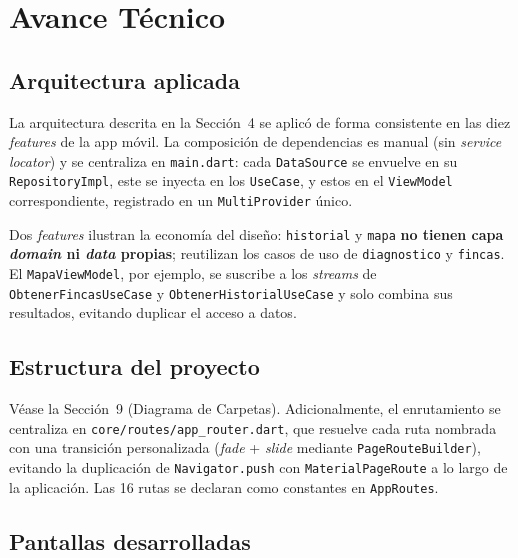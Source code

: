 \documentclass[12pt,a4paper]{article}
\begin{document}
\newpage
\section{Avance Técnico}

\subsection{Arquitectura aplicada}

La arquitectura descrita en la Sección~4 se aplicó de forma consistente en las
diez \textit{features} de la app móvil. La composición de dependencias es manual
(sin \textit{service locator}) y se centraliza en \texttt{main.dart}: cada
\texttt{DataSource} se envuelve en su \texttt{RepositoryImpl}, este se inyecta en
los \texttt{UseCase}, y estos en el \texttt{ViewModel} correspondiente,
registrado en un \texttt{MultiProvider} único.

Dos \textit{features} ilustran la economía del diseño: \texttt{historial} y
\texttt{mapa} \textbf{no tienen capa \textit{domain} ni \textit{data} propias};
reutilizan los casos de uso de \texttt{diagnostico} y \texttt{fincas}. El
\texttt{MapaViewModel}, por ejemplo, se suscribe a los \textit{streams} de
\texttt{ObtenerFincasUseCase} y \texttt{ObtenerHistorialUseCase} y solo combina
sus resultados, evitando duplicar el acceso a datos.

\subsection{Estructura del proyecto}

Véase la Sección~9 (Diagrama de Carpetas). Adicionalmente, el enrutamiento se
centraliza en \texttt{core/routes/app\_router.dart}, que resuelve cada ruta
nombrada con una transición personalizada (\textit{fade} + \textit{slide}
mediante \texttt{PageRouteBuilder}), evitando la duplicación de
\texttt{Navigator.push} con \texttt{MaterialPageRoute} a lo largo de la
aplicación. Las 16 rutas se declaran como constantes en \texttt{AppRoutes}.

\subsection{Pantallas desarrolladas}
\end{document}

